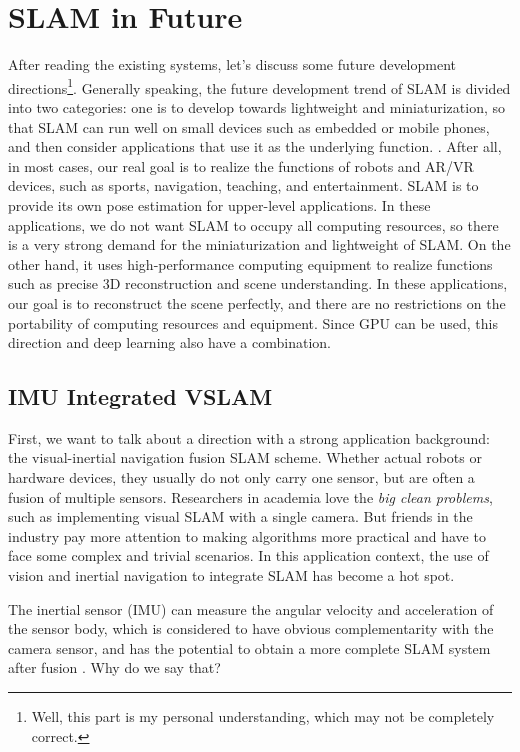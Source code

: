 \section{SLAM in Future}
After reading the existing systems, let’s discuss some future development directions\footnote{Well, this part is my personal understanding, which may not be completely correct.}. Generally speaking, the future development trend of SLAM is divided into two categories: one is to develop towards lightweight and miniaturization, so that SLAM can run well on small devices such as embedded or mobile phones, and then consider applications that use it as the underlying function. . After all, in most cases, our real goal is to realize the functions of robots and AR/VR devices, such as sports, navigation, teaching, and entertainment. SLAM is to provide its own pose estimation for upper-level applications. In these applications, we do not want SLAM to occupy all computing resources, so there is a very strong demand for the miniaturization and lightweight of SLAM. On the other hand, it uses high-performance computing equipment to realize functions such as precise 3D reconstruction and scene understanding. In these applications, our goal is to reconstruct the scene perfectly, and there are no restrictions on the portability of computing resources and equipment. Since GPU can be used, this direction and deep learning also have a combination.

\subsection{IMU Integrated VSLAM}
First, we want to talk about a direction with a strong application background: the visual-inertial navigation fusion SLAM scheme. Whether actual robots or hardware devices, they usually do not only carry one sensor, but are often a fusion of multiple sensors. Researchers in academia love the \textit{big clean problems}, such as implementing visual SLAM with a single camera. But friends in the industry pay more attention to making algorithms more practical and have to face some complex and trivial scenarios. In this application context, the use of vision and inertial navigation to integrate SLAM has become a hot spot.

The inertial sensor (IMU) can measure the angular velocity and acceleration of the sensor body, which is considered to have obvious complementarity with the camera sensor, and has the potential to obtain a more complete SLAM system after fusion {\cite{Gui2015}}. Why do we say that?

